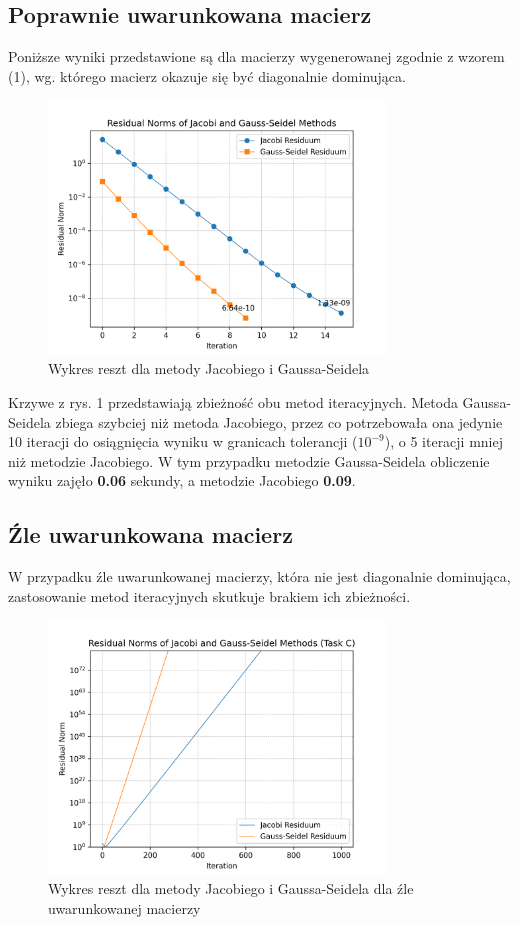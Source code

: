 \documentclass[a4paper,12pt]{article}  %
\begin{document}
\subsection{Poprawnie uwarunkowana macierz}

Poniższe wyniki przedstawione są dla macierzy wygenerowanej zgodnie z wzorem
(1), wg. którego macierz okazuje się być diagonalnie dominująca.


\begin{figure}[H]
  \centering
  \includegraphics[width=0.8\textwidth]{./graphs/residuals_task_a.png}
  \caption{Wykres reszt dla metody Jacobiego i Gaussa-Seidela}
\end{figure}
Krzywe z rys. 1 przedstawiają zbieżność obu metod iteracyjnych. Metoda 
Gaussa-Seidela zbiega szybciej niż metoda Jacobiego, przez co potrzebowała
ona jedynie 10 iteracji do osiągnięcia wyniku w granicach tolerancji
($10^{-9}$), o 5 iteracji mniej niż metodzie Jacobiego. W tym przypadku metodzie 
Gaussa-Seidela obliczenie wyniku zajęło \textbf{0.06} sekundy, a metodzie
Jacobiego \textbf{0.09}.

\subsection{Źle uwarunkowana macierz}
W przypadku źle uwarunkowanej macierzy, która nie jest diagonalnie
dominująca, zastosowanie metod iteracyjnych skutkuje brakiem
ich zbieżności.

\begin{figure}[H]
  \centering
  \includegraphics[width=0.8\textwidth]{./graphs/residuals_task_c.png}
  \caption{Wykres reszt dla metody Jacobiego i Gaussa-Seidela dla źle
  uwarunkowanej macierzy}
\end{figure}
\end{document}
